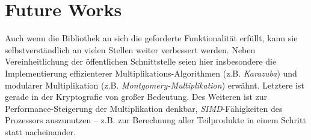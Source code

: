 \section{Future Works}
Auch wenn die Bibliothek an sich die geforderte Funktionalität erfüllt, kann sie selbstverständlich an vielen Stellen weiter verbessert werden.
Neben Vereinheitlichung der öffentlichen Schnittstelle seien hier insbesondere die Implementierung effizienterer Multiplikations-Algorithmen (z.B. \emph{Karazuba}) und modularer Multiplikation (z.B. \emph{Montgomery-Multiplikation}) erwähnt. Letztere ist gerade in der Kryptografie von großer Bedeutung.
Des Weiteren ist zur Performance-Steigerung der Multiplikation denkbar, \emph{SIMD}-Fähigkeiten des Prozessors auszunutzen -- z.B. zur Berechnung aller Teilprodukte in einem Schritt statt nacheinander.
